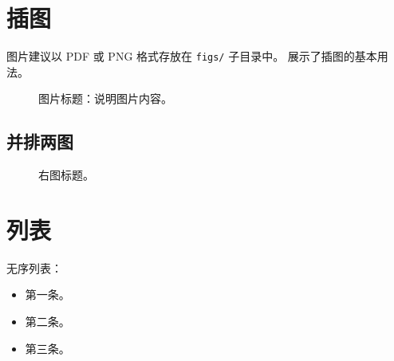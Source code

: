 
\section{插图}

图片建议以 PDF 或 PNG 格式存放在 \texttt{figs/} 子目录中。
 展示了插图的基本用法。

\begin{figure}[htbp]
  \centering
  \caption{图片标题：说明图片内容。}
  \label{fig:example}
\end{figure}

\subsection{并排两图}

\begin{figure}[htbp]
  \centering
  \begin{minipage}[b]{0.45\textwidth}
    \centering
    \caption{左图标题。}
    \label{fig:left}
  \end{minipage}
  \hfill
  \begin{minipage}[b]{0.45\textwidth}
    \centering
    \caption{右图标题。}
    \label{fig:right}
  \end{minipage}
\end{figure}

\section{列表}

无序列表：
\begin{itemize}
  \item 第一条。
  \item 第二条。
  \item 第三条。
\end{itemize}

